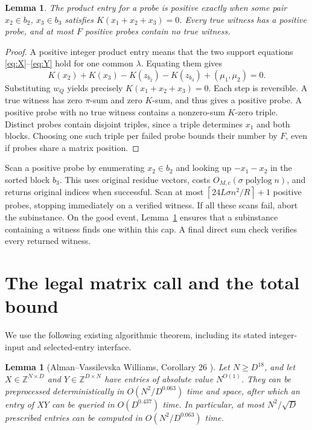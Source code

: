 \documentclass[acmsmall,11pt,nonacm,natbib=false]{acmart}
\newtheorem{lemma}[theorem]{Lemma}
\newcommand{\Z}{\mathbb Z}
\newcommand{\polylog}{\operatorname{polylog}}
\newcommand{\ceil}[1]{\left\lceil #1\right\rceil}
\begin{document}
\begin{lemma}\label{lem:semantics}
The product entry for a probe is positive exactly when some pair
$x_2\in b_2$, $x_3\in b_3$ satisfies $K(x_1+x_2+x_3)=0$.
Every true witness has a positive probe, and at most $F$ positive probes
contain no true witness.
\end{lemma}
\begin{proof}
A positive integer product entry means that the two support equations
\eqref{eq:X}--\eqref{eq:Y} hold for one common $\lambda$. Equating them
gives
\[
 K(x_2)+K(x_3)-K(z_{b_2})-K(z_{b_3})+(\mu_1,\mu_2)=0.
\]
Substituting $w_Q$ yields precisely $K(x_1+x_2+x_3)=0$. Each step is
reversible. A true witness has zero $\pi$-sum and zero $K$-sum, and thus
gives a positive probe. A positive probe with no true witness contains
a nonzero-sum $K$-zero triple. Distinct probes contain disjoint triples,
since a triple determines $x_1$ and both blocks. Choosing one such triple
per failed probe bounds their number by $F$, even if probes share a matrix
position.
\end{proof}

Scan a positive probe by enumerating $x_2\in b_2$ and looking up
$-x_1-x_2$ in the sorted block $b_3$. This uses original residue vectors,
costs $O_{M,c}(\sigma\polylog n)$, and returns original indices when
successful. Scan at most $\ceil{24L\sigma n^2/R}+1$ positive probes,
stopping immediately on a verified witness. If all these scans fail,
abort the subinstance. On the good event, Lemma~\ref{lem:semantics}
ensures that a subinstance containing a witness finds one within this
cap. A final direct sum check verifies every returned witness.

\section{The legal matrix call and the total bound}\label{sec:time}

We use the following existing algorithmic theorem, including its stated
integer-input and selected-entry interface.

\begin{lemma}[Alman--Vassilevska Williams, Corollary 26 \cite{AVW26}]
\label{lem:thin}
Let $N\ge D^{18}$, and let $X\in\Z^{N\times D}$ and
$Y\in\Z^{D\times N}$ have entries of absolute value $N^{O(1)}$.
They can be preprocessed deterministically in $O(N^2/D^{0.063})$ time
and space, after which an entry of $XY$ can be queried in $O(D^{0.437})$
time. In particular, at most $N^2/\sqrt D$ prescribed entries can be
computed in $O(N^2/D^{0.063})$ time.
\end{lemma}
\end{document}
